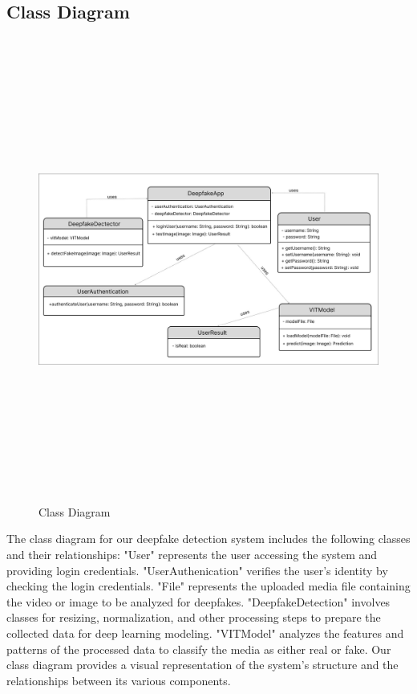 
\subsection{Class Diagram}
\vspace{1cm}
\begin{figure}[h]
    \includegraphics[width=1\textwidth,height=6in,keepaspectratio]{img/classdiagram.jpg}
    \caption{{Class Diagram}}
\end{figure}

\justify
The class diagram for our deepfake detection system includes the following classes and their relationships: "User" represents the user accessing the system and providing login credentials. "UserAuthenication" verifies the user's identity by checking the login credentials. "File" represents the uploaded media file containing the video or image to be analyzed for deepfakes. "DeepfakeDetection" involves classes for resizing, normalization, and other processing steps to prepare the collected data for deep learning modeling. "VITModel" analyzes the features and patterns of the processed data to classify the media as either real or fake. Our class diagram provides a visual representation of the system's structure and the relationships between its various components.

